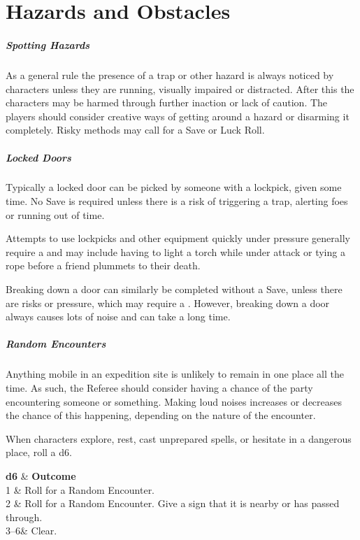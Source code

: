 \documentclass[itdr]{subfiles}
\begin{document}
\chapter{Hazards and Obstacles}

\paragraph{Spotting Hazards}
As a general rule the presence of a trap or other hazard is always noticed by characters unless they are running, visually impaired or distracted. After this the characters may be harmed through further inaction or lack of caution. The players should consider creative ways of getting around a hazard or disarming it completely. Risky methods may call for a Save or Luck Roll.

\paragraph{Locked Doors}
Typically a locked door can be picked by someone with a lockpick, given some time. No Save is required unless there is a risk of triggering a trap, alerting foes or running out of time.

Attempts to use lockpicks and other equipment quickly under pressure generally require a  and may include having to light a torch while under attack or tying a rope before a friend plummets to their death.

Breaking down a door can similarly be completed without a Save, unless there are risks or pressure, which may require a . However, breaking down a door always causes lots of noise and can take a long time.

\paragraph{Random Encounters}
Anything mobile in an expedition site is unlikely to remain in one place all the time. As such, the Referee should consider having a chance of the party encountering someone or something. Making loud noises increases or decreases the chance of this happening, depending on the nature of the encounter.

When characters explore, rest, cast unprepared spells, or hesitate in a dangerous place, roll a d6.

\begin{dtable}[cX]
	\textbf{d6} & \textbf{Outcome} \\
	1	& Roll for a Random Encounter.\\
	2	& Roll for a Random Encounter. Give a sign that it is nearby or has passed through.\\
	3--6& Clear.\\
\end{dtable}
\end{document}
